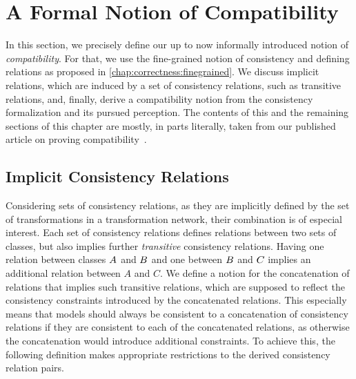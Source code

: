 \section{A Formal Notion of Compatibility}
\label{chap:compatibility:formal_notion}

In this section, we precisely define our up to now informally introduced notion of \emph{compatibility}.
For that, we use the fine-grained notion of consistency and defining relations as proposed in \autoref{chap:correctness:finegrained}.
We discuss implicit relations, which are induced by a set of consistency relations, such as transitive relations, and,
finally, derive a compatibility notion from the consistency formalization and its pursued perception.
The contents of this and the remaining sections of this chapter are mostly, in parts literally, taken from our published article on proving compatibility~.


\subsection{Implicit Consistency Relations}

Considering sets of consistency relations, as they are implicitly defined by the set of transformations in a transformation network, their combination is of especial interest.
Each set of consistency relations defines relations between two sets of classes, but also implies further \emph{transitive} consistency relations.
Having one relation between classes $\class{A}{}$ and $\class{B}{}$ and one between $\class{B}{}$ and $\class{C}{}$ implies an additional relation between $A$ and $C$.
We define a notion for the concatenation of relations that implies such transitive relations, which are supposed to reflect the consistency constraints introduced by the concatenated relations.
This especially means that models should always be consistent to a concatenation of consistency relations if they are consistent to each of the concatenated relations, as otherwise the concatenation would introduce additional constraints.
To achieve this, the following definition makes appropriate restrictions to the derived consistency relation pairs.

